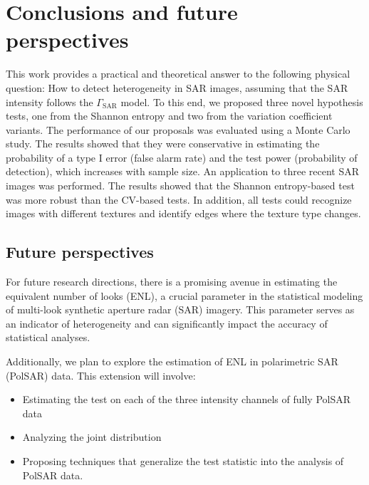 \chapter{Conclusions and future perspectives}\label{chp:conclusions}

This work provides a practical and theoretical answer to the
following physical question: How to detect heterogeneity in SAR images,
assuming that the SAR intensity follows the \(\Gamma_{\text{SAR}}\)
model. To this end, we proposed three novel hypothesis tests, one from
the Shannon entropy and two from the variation coefficient variants. The
performance of our proposals was evaluated using a Monte Carlo study.
The results showed that they were conservative in estimating the
probability of a type I error (false alarm rate) and the test power
(probability of detection), which increases with sample size. An
application to three recent SAR images was performed. The results showed
that the Shannon entropy-based test was more robust than the CV-based
tests. In addition, all tests could recognize images with different
textures and identify edges where the texture type changes.


\section*{Future perspectives}

For future research directions, there is a promising avenue in estimating the equivalent number of looks (ENL), a crucial parameter in the statistical modeling of multi-look synthetic aperture radar (SAR) imagery. This parameter serves as an indicator of heterogeneity and can significantly impact the accuracy of statistical analyses.

Additionally, we plan to explore the estimation of ENL in polarimetric SAR (PolSAR) data. This extension will involve:
\begin{itemize}
	\item Estimating the test on each of the three intensity channels of fully PolSAR data
	\item Analyzing the joint distribution
	\item Proposing techniques that generalize the test statistic  into the analysis of PolSAR data.
\end{itemize}